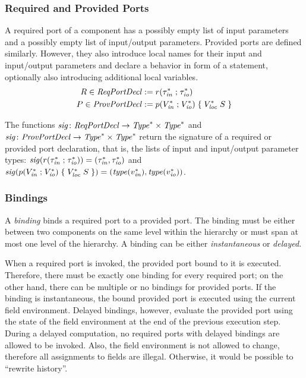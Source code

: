 \documentclass[a4paper,10pt,english]{article}
\begin{document}
\subsubsection{Required and Provided Ports}
A required port of a component has a possibly empty list of input parameters and a possibly empty list of input/output parameters. 
Provided ports are defined similarly. However, they also introduce local names for their input and input/output parameters and
declare a behavior in form of a statement, optionally also introducing additional local variables. 
\begin{align*}
	R \in \mathit{ReqPortDecl} &:=
		r \mathtt{(} \tau_\mathit{in}^* \; \mathtt{;} \; \tau_\mathit{io}^* \mathtt{)}
	\\
	P \in \mathit{ProvPortDecl} &:= p \mathtt{(} V^*_\mathit{in} \; \mathtt{;} \; V^*_\mathit{io} \mathtt{) \; \{} \; V^*_\mathit{loc} \; S \; \mathtt{\}}
\end{align*}

The functions $\mathit{sig} \colon
\mathit{ReqPortDecl} \rightarrow \mathit{Type}^* \times \mathit{Type}^*$ and $\mathit{sig} \colon \mathit{ProvPortDecl} \rightarrow \mathit{Type}^* \times
\mathit{Type}^*$ return the signature of a required or provided port declaration, that is, the lists of input and input/output
parameter types:
$\mathit{sig}(r \mathtt{(} \tau_\mathit{in}^* \; \mathtt{;} \; \tau_\mathit{io}^* \mathtt{)}) = (\tau_\mathit{in}^*,
\tau_\mathit{io}^*)$ and
$\mathit{sig}(p \mathtt{(} V^*_\mathit{in} \; \mathtt{;} \; V^*_\mathit{io} \mathtt{) \; \{} \; V^*_\mathit{loc} \; S \; \mathtt{\}})
= (\mathit{type}(v_{\mathit{in}}^*), \mathit{type}(v_{\mathit{io}}^*))$.

\subsubsection{Bindings}
A \textit{binding} binds a required port to a provided port. The binding must be either between two components on the
same level within the hierarchy or must span at most one level of the hierarchy. A binding can be either
\textit{instantaneous} or \textit{delayed}.

When a required port is invoked, the provided port bound to it is executed. Therefore, there must be exactly one binding for every
required port; on the other hand, there can be multiple or no bindings for provided ports. If the binding is instantaneous, the
bound provided port is executed using the current field environment. Delayed bindings, however, evaluate the provided port using
the state of the field environment at the end of the previous execution step. During a delayed computation, no required ports with
delayed bindings are allowed to be invoked. Also, the field environment is not allowed to change, therefore all assignments to
fields are illegal. Otherwise, it would be possible to ``rewrite history''.
\end{document}
